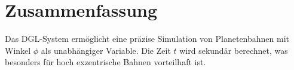\section{Zusammenfassung}
Das DGL-System ermöglicht eine präzise Simulation von Planetenbahnen mit Winkel $\phi$ als unabhängiger Variable. Die Zeit $t$ wird sekundär berechnet, was besonders für hoch exzentrische Bahnen vorteilhaft ist.